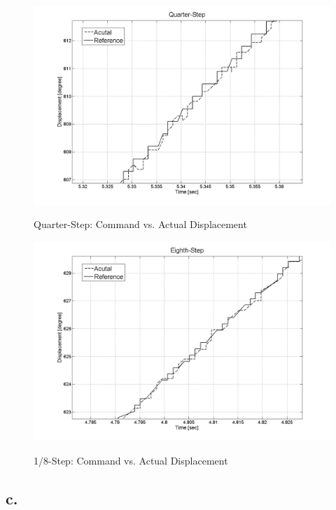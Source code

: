 \documentclass{article}
\theoremstyle{plain}
\theoremstyle{definition}
\theoremstyle{remark}
\begin{document}
\begin{figure}[htb]
\begin{center}
\includegraphics[width=14cm]{Q4_quarter_step_L.png}
\caption{Quarter-Step: Command vs. Actual Displacement} \label{tex}
\label{fig:q4_17}
\end{center}
\end{figure}

\begin{figure}[htb]
\begin{center}
\includegraphics[width=14cm]{Q4_eighth_step_L.png}
\caption{1/8-Step: Command vs. Actual Displacement} \label{tex}
\label{fig:q4_18}
\end{center}
\end{figure}

\clearpage 


\subsection*{c.}
\end{document}
